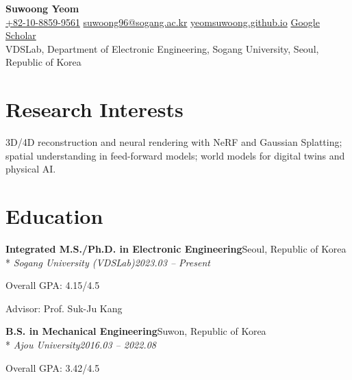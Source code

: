 \documentclass[10pt]{article}
\newcommand{\entry}[4]{%
  \item \textbf{#1}\hfill #2\\*
  \textit{#3}\hfill\textit{#4}}
\begin{document}
\begin{center}
  {\fontsize{26}{30}\selectfont\bfseries Suwoong Yeom}\\[5pt]
  {\small
    \href{tel:+821088599561}{+82-10-8859-9561} \textbar{}
    \href{mailto:suwoong96@sogang.ac.kr}{suwoong96@sogang.ac.kr} \textbar{}
    \href{https://yeomsuwoong.github.io}{yeomsuwoong.github.io} \textbar{}
    \href{https://scholar.google.com/citations?hl=en&user=7wG0GVcAAAAJ}{Google Scholar}%
    \\[1pt]
    VDSLab, Department of Electronic Engineering, Sogang University, Seoul, Republic of Korea}
\end{center}

\section{Research Interests}
\begin{entries}
  \item 3D/4D reconstruction and neural rendering with NeRF and Gaussian Splatting;
  spatial understanding in feed-forward models; world models for digital twins and physical AI.
\end{entries}

\section{Education}
\begin{entries}
  \entry{Integrated M.S./Ph.D. in Electronic Engineering}{Seoul, Republic of Korea}
        {Sogang University (VDSLab)}{2023.03 -- Present}
  \begin{details}
    \item Overall GPA: 4.15/4.5
    \item Advisor: Prof. Suk-Ju Kang
  \end{details}

  \entry{B.S. in Mechanical Engineering}{Suwon, Republic of Korea}
        {Ajou University}{2016.03 -- 2022.08}
  \begin{details}
    \item Overall GPA: 3.42/4.5
  \end{details}
\end{entries}
\end{document}

